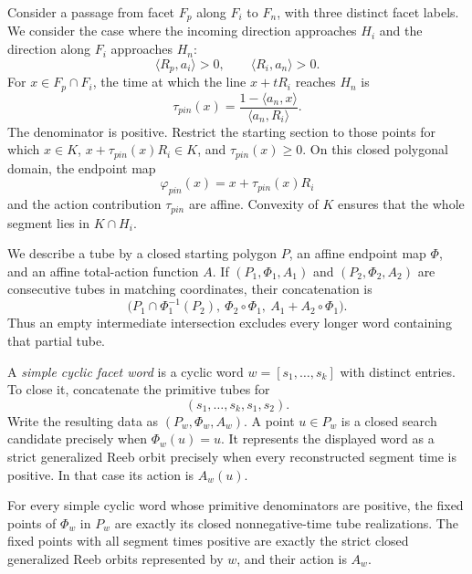 Consider a passage from facet $F_p$ along $F_i$ to $F_n$, with three
distinct facet labels. We consider the case where the incoming direction
approaches $H_i$ and the direction along $F_i$ approaches $H_n$:
\[
  \langle R_p,a_i\rangle>0,
  \qquad
  \langle R_i,a_n\rangle>0.
\]
For \(x\in F_p\cap F_i\), the time at which the line
\(x+tR_i\) reaches \(H_n\) is
\begin{equation}\label{eq:fg-primitive-time}
  \tau_{pin}(x)
  =\frac{1-\langle a_n,x\rangle}{\langle a_n,R_i\rangle}.
\end{equation}
The denominator is positive.  Restrict the starting section to those points
for which \(x\in K\), \(x+\tau_{pin}(x)R_i\in K\), and
\(\tau_{pin}(x)\geq0\).  On this closed polygonal domain, the endpoint map
\[
  \varphi_{pin}(x)=x+\tau_{pin}(x)R_i
\]
and the action contribution \(\tau_{pin}\) are affine.  Convexity of \(K\)
ensures that the whole segment lies in \(K\cap H_i\).

We describe a tube by a closed starting polygon \(P\), an affine endpoint map
\(\Phi\), and an affine total-action function \(A\).  If
\((P_1,\Phi_1,A_1)\) and \((P_2,\Phi_2,A_2)\) are consecutive tubes in
matching coordinates, their concatenation is
\begin{equation}\label{eq:fg-tube-composition}
  \bigl(P_1\cap\Phi_1^{-1}(P_2),
  \ \Phi_2\circ\Phi_1,
  \ A_1+A_2\circ\Phi_1\bigr).
\end{equation}
Thus an empty intermediate intersection excludes every longer word containing
that partial tube.

A \emph{simple cyclic facet word} is a cyclic word
\(w=[s_1,\ldots,s_k]\) with distinct entries.  To close it, concatenate the
primitive tubes for
\[
  (s_1,\ldots,s_k,s_1,s_2).
\]
Write the resulting data as \((P_w,\Phi_w,A_w)\).  A point
\(u\in P_w\) is a closed search candidate precisely when
\(\Phi_w(u)=u\).  It represents the displayed word as a strict generalized
Reeb orbit precisely when every reconstructed segment time is positive.  In
that case its action is \(A_w(u)\).

\begin{lemma}\label{lem:flow-graph-tube-semantics}
For every simple cyclic word whose primitive denominators are positive, the
fixed points of \(\Phi_w\) in \(P_w\) are exactly its closed nonnegative-time
tube realizations.  The fixed points with all segment times positive are
exactly the strict closed generalized Reeb orbits represented by \(w\), and
their action is \(A_w\).
\end{lemma}

